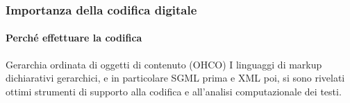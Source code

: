 \begin{frame}
	\frametitle{Importanza della codifica digitale}
	\framesubtitle{Perché effettuare la codifica}
	\addtocounter{nframe}{1}

	\begin{block}{Gerarchia ordinata di oggetti di contenuto (OHCO)}
	 I linguaggi di markup dichiarativi gerarchici, e in particolare SGML prima e XML poi, si sono rivelati ottimi strumenti di supporto alla codifica e all’analisi computazionale dei testi.
	\end{block}

\end{frame}




